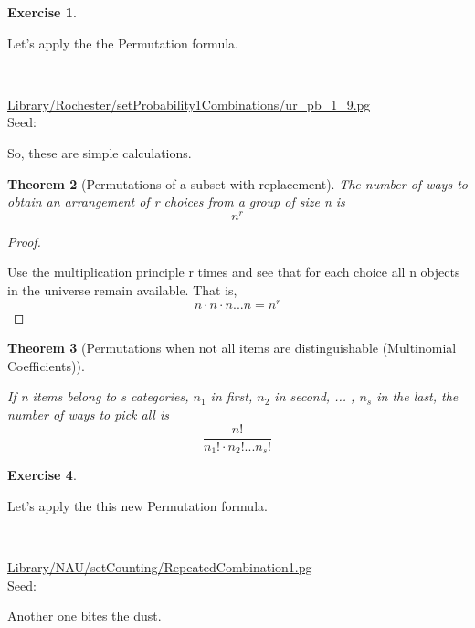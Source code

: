 \documentclass[10pt,]{book}
\theoremstyle{plain}
\newtheorem{theorem}{Theorem}[section]
\theoremstyle{definition}
\theoremstyle{definition}
\theoremstyle{definition}
\newtheorem{exercise}[theorem]{Exercise}
\numberwithin{equation}{section}
\begin{document}
\begin{exercise}\label{exercise-11}

		Let's apply the the Permutation formula.
\par\medskip
\mbox{}\\ %
\begin{mdframed}
{}\par\vspace*{2ex}%
{\tiny\ttfamily\noindent\url{Library/Rochester/setProbability1Combinations/ur_pb_1_9.pg}\\Seed: \hfill}\end{mdframed}
\medskip\noindent 
		So, these are simple calculations.
\par
\end{exercise}
\begin{theorem}[{Permutations of a subset with replacement}]\label{theorem-7}
The number of ways to obtain an arrangement of r choices from a group of size n is 
		\begin{equation*}n^r\end{equation*}\end{theorem}
\begin{proof}\hypertarget{proof-7}{}

			Use the multiplication principle r times and see that for each choice all n objects in the universe remain available.  That is, 
			\begin{equation*}n \cdot n \cdot n ... n = n^r\end{equation*}
\end{proof}
\begin{theorem}[{Permutations when not all items are distinguishable (Multinomial Coefficients)}]\label{theorem-8}

If n items belong to s categories, \(n_1\) in first, \(n_2\) in second, ... , \(n_s\) in the last, the number of ways to pick all is
		\begin{equation*}\frac{n!}{n_1! \cdot n_2! ... n_s!}\end{equation*}\end{theorem}
\begin{exercise}\label{exercise-12}

		Let's apply the this new Permutation formula.
\par\medskip
\mbox{}\\ %
\begin{mdframed}
{}\par\vspace*{2ex}%
{\tiny\ttfamily\noindent\url{Library/NAU/setCounting/RepeatedCombination1.pg}\\Seed: \hfill}\end{mdframed}
\medskip\noindent 
		Another one bites the dust.
\par
\end{exercise}
\typeout{************************************************}
\typeout{************************************************}
\end{document}
